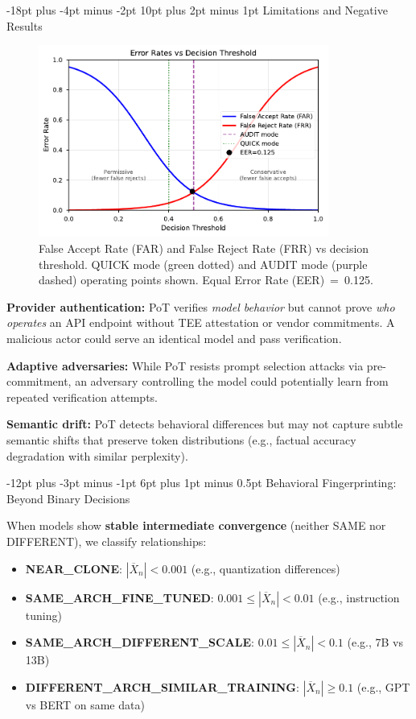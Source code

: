 \documentclass[11pt]{article}
\makeatletter
\renewcommand\section{\@startsection{section}{1}{\z@}%
  {-18pt plus -4pt minus -2pt}%
  {10pt plus 2pt minus 1pt}%
  {\normalfont\Large\bfseries}}
\renewcommand\subsection{\@startsection{subsection}{2}{\z@}%
  {-12pt plus -3pt minus -1pt}%
  {6pt plus 1pt minus 0.5pt}%
  {\normalfont\large\bfseries}}
\makeatother
\begin{document}
\section{Limitations and Negative Results}

\begin{figure}[t]
\centering
\includegraphics[width=0.85\textwidth]{figures/fig2_error_rates.pdf}
\caption{False Accept Rate (FAR) and False Reject Rate (FRR) vs decision threshold. QUICK mode (green dotted) and AUDIT mode (purple dashed) operating points shown. Equal Error Rate (EER)~=~0.125.}
\label{fig:error-rates}
\end{figure}

\textbf{Provider authentication:} PoT verifies \emph{model behavior} but cannot prove \emph{who operates} an API endpoint without TEE attestation or vendor commitments. A malicious actor could serve an identical model and pass verification.

\textbf{Adaptive adversaries:} While PoT resists prompt selection attacks via pre-commitment, an adversary controlling the model could potentially learn from repeated verification attempts.

\textbf{Semantic drift:} PoT detects behavioral differences but may not capture subtle semantic shifts that preserve token distributions (e.g., factual accuracy degradation with similar perplexity).

\subsection{Behavioral Fingerprinting: Beyond Binary Decisions}
\label{sec:behavioral-fingerprinting}

When models show \textbf{stable intermediate convergence} (neither SAME nor DIFFERENT), we classify relationships:
\begin{itemize}
\item \textbf{NEAR\_CLONE}: $|\overline{X}_n| < 0.001$ (e.g., quantization differences)
\item \textbf{SAME\_ARCH\_FINE\_TUNED}: $0.001 \leq |\overline{X}_n| < 0.01$ (e.g., instruction tuning)
\item \textbf{SAME\_ARCH\_DIFFERENT\_SCALE}: $0.01 \leq |\overline{X}_n| < 0.1$ (e.g., 7B vs 13B)
\item \textbf{DIFFERENT\_ARCH\_SIMILAR\_TRAINING}: $|\overline{X}_n| \geq 0.1$ (e.g., GPT vs BERT on same data)
\end{itemize}
\end{document}
